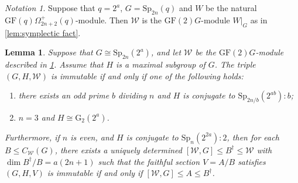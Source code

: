 \documentclass[12pt]{amsart}
\newtheorem{lemma}[theorem]{Lemma}
\theoremstyle{remark}
\theoremstyle{notation}
\newtheorem{notation}[theorem]{Notation}
\theoremstyle{definition}
\newcommand{\GF}{\mathrm{GF}}
\newcommand{\Sp}{\mathrm{Sp}}
\newcommand{\0}{\emptyset}
\begin{document}
\begin{notation}\label{not:symp mod} Suppose that $q=2^a$, $G=\Sp_{2n}(q)$ and $W$ be the natural $\GF(q)\Omega_{2n+2}^+(q)$-module. Then $\mathcal W$ is the $\GF(2)G$-module $W|_G$ as in \cref{lem:symplectic fact}. \end{notation}

  \begin{lemma}\label{lem:sp2nq immutable struct}
  Suppose that $G\cong \Sp_{2n}(2^a)$, and let $\mathcal W$ be the $\GF(2)G$-module described in \cref{not:symp mod}. Assume that $H$ is a maximal subgroup of $G$. The triple $(G,H,\mathcal W)$ is immutable if and only if  one of the following holds:
  \begin{enumerate}
 \item  there exists an odd prime $b$ dividing $n$ and $H$ is conjugate to $\Sp_{2n/b}(2^{ab}){:b}$;
 \item $n=3$ and $H \cong \mathrm{G}_2(2^a)$.
 \end{enumerate}
 Furthermore, if $n$ is even, and  $H$ is conjugate to  $\Sp_{n}(2^{2a}){:}2$, then  for each $B \le C_{\mathcal W}(G)$, there exists  a uniquely determined $[{\mathcal W},G] \le B^\dagger \le {\mathcal W}$ with $\dim B^\dagger /B=a(2n+1)$ such that the faithful section $V= A/B$ satisfies $(G,H,V)$ is immutable if and only if $[{\mathcal W},G]\le A\le B^\dagger$.
  \end{lemma}
\end{document}
